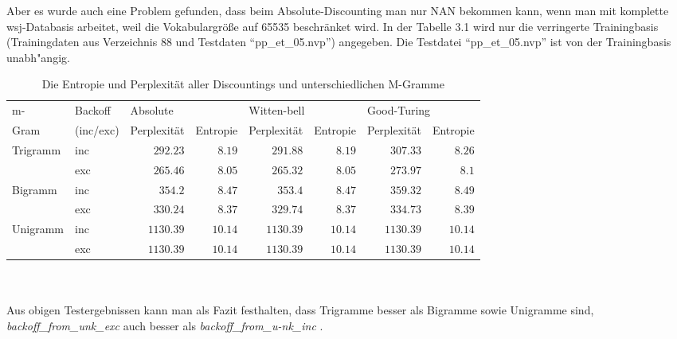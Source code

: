 Aber es wurde auch eine Problem gefunden, dass beim Absolute-Discounting man nur NAN bekommen kann, wenn man mit komplette wsj-Databasis arbeitet, weil die Vokabulargr\"o\ss e auf 65535 beschr\"anket wird. In der Tabelle 3.1 wird nur die verringerte Trainingbasis (Trainingdaten aus Verzeichnis 88 und Testdaten "`pp\_et\_05.nvp"') angegeben. Die Testdatei "`pp\_et\_05.nvp"' ist von der Trainingbasis unabh"angig.
\begin{table}[h]
  \begin{center}
  \small\addtolength{\tabcolsep}{-5pt}
    \begin{tabular}{l|l|r|r|r|r|r|r}
     \toprule
     m- &Backoff &\multicolumn{2}{|l|}{Absolute}&\multicolumn{2}{|l|}{Witten-bell}&\multicolumn{2}{l}{Good-Turing}\\
	  \cline{3-8}
	  Gram&(inc/exc)&Perplexit\"at&Entropie&Perplexit\"at&Entropie&Perplexit\"at&Entropie\\
    \hline
    \hline
		Trigramm &inc 	& $292.23$ 	& $8.19$ 	& $291.88$ 	& $8.19$ 	& $307.33$ 	& $8.26$\\
				 		 &exc		& $265.46$ 	& $8.05$ 	& $265.32$ 	& $8.05$ 	& $273.97$ 	& $8.1$\\
		\hline
		Bigramm  &inc 	& $354.2$ 	& $8.47$ 	& $353.4$ 	& $8.47$ 	& $359.32$ 	& $8.49$\\
				 		 &exc		& $330.24$ 	& $8.37$ 	& $329.74$ 	& $8.37$ 	& $334.73$ 	& $8.39$\\
		\hline
		Unigramm &inc 	& $1130.39$ & $10.14$ & $1130.39$ & $10.14$ & $1130.39$ & $10.14$\\
				 		 &exc		& $1130.39$ & $10.14$ & $1130.39$ & $10.14$ & $1130.39$ & $10.14$\\
     \bottomrule
    \end{tabular}
  \end{center}
     \caption{Die Entropie und Perplexit\"at aller Discountings und unterschiedlichen M-Gramme}
\label{tab:table_3}
\end{table}
\\
\\
Aus obigen Testergebnissen kann man als Fazit festhalten, dass Trigramme besser als Bigramme sowie Unigramme sind, \emph{backoff\_from\_unk\_exc} auch besser als \emph{backoff\_from\_u-nk\_inc} . 